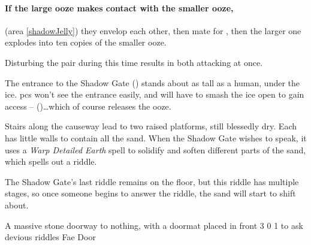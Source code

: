 \paragraph{If the large ooze makes contact with the smaller ooze,}
(area \vref{shadowJelly})
they envelop each other, then mate for , then the larger one explodes into ten copies of the smaller ooze.

Disturbing the pair during this time results in  both attacking at once.


The entrance to the Shadow Gate () stands about as tall as a human, under the ice.
\Glspl{pc} won't see the entrance easily, and will have to smash the ice open to gain access --  (\tn[10])\ldots which of course releases the ooze.

Stairs along the causeway lead to two raised platforms, still blessedly dry.
Each has little walls to contain all the sand.
When the Shadow Gate wishes to speak, it uses a \textit{Warp Detailed Earth} spell to solidify and soften different parts of the sand, which spells out a riddle.

The Shadow Gate's last riddle remains on the floor, but this riddle has multiple stages, so once someone begins to answer the riddle, the sand will start to shift about.

  {A massive stone doorway to nothing, with a doormat placed in front}%
  {3}%
  {0}%
  {1}%
  {to ask devious riddles}%
  {Fae Door}%
  {
    \setcounter{Fire}{3}
    \setcounter{Earth}{2}
    \setcounter{Fate}{1}
    \setcounter{Water}{1}
    \setcounter{Academics}{2}
    \setcounter{Wyldcrafting}{1}
  }%

\showStdSpells[
  \setcounter{diceNo}{0}
]


